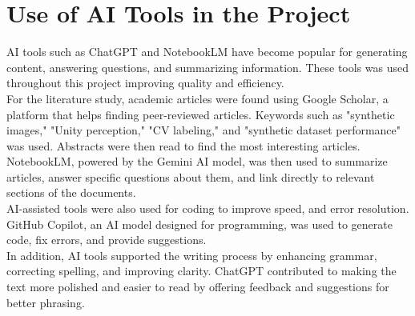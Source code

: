 \section{Use of AI Tools in the Project}

AI tools such as ChatGPT and NotebookLM have become popular for generating content, answering questions, and summarizing information. These tools was used throughout this project improving quality and efficiency. \\


\noindent For the literature study, academic articles were found using Google Scholar, a platform that helps finding peer-reviewed articles. Keywords such as "synthetic images," "Unity perception," "CV labeling," and "synthetic dataset performance" was used. Abstracts were then read to find the most interesting articles. NotebookLM, powered by the Gemini AI model, was then used to summarize articles, answer specific questions about them, and link directly to relevant sections of the documents.\\

\noindent AI-assisted tools were also used for coding to improve speed, and error resolution. GitHub Copilot, an AI model designed for programming, was used to generate code, fix errors, and provide suggestions.\\

\noindent In addition, AI tools supported the writing process by enhancing grammar, correcting spelling, and improving clarity. ChatGPT contributed to making the text more polished and easier to read by offering feedback and suggestions for better phrasing.


